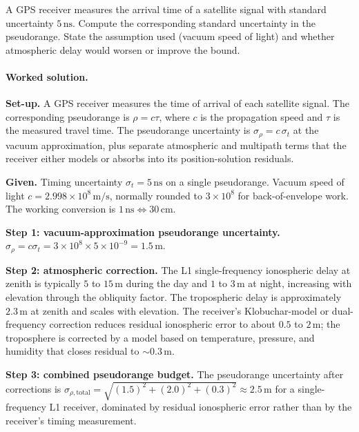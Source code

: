 \begin{exercise}
A GPS receiver measures the arrival time of a satellite signal with
standard uncertainty $5 \,\si{\nano\second}$. Compute the
corresponding standard uncertainty in the pseudorange. State the
assumption used (vacuum speed of light) and whether atmospheric
delay would worsen or improve the bound.

\paragraph{Worked solution.}
\textbf{Set-up.} A GPS receiver measures the time of arrival of
each satellite signal. The corresponding pseudorange is
$\rho = c \tau$, where $c$ is the propagation speed and $\tau$ is
the measured travel time. The pseudorange uncertainty is
$\sigma_{\rho} = c \,\sigma_{t}$ at the vacuum approximation,
plus separate atmospheric and multipath terms that the receiver
either models or absorbs into its position-solution residuals.

\textbf{Given.} Timing uncertainty $\sigma_{t} = 5 \,\si{\nano
\second}$ on a single pseudorange. Vacuum speed of light
$c = 2.998 \times 10^{8} \,\si{\meter\per\second}$, normally
rounded to $3 \times 10^{8}$ for back-of-envelope work. The
working conversion is $1 \,\si{\nano\second} \Leftrightarrow 30
\,\si{\centi\meter}$.

\textbf{Step 1: vacuum-approximation pseudorange uncertainty.}
$\sigma_{\rho} = c \sigma_{t} = 3 \times 10^{8} \times 5 \times
10^{-9} = 1.5 \,\si{\meter}$.

\textbf{Step 2: atmospheric correction.} The L1 single-frequency
ionospheric delay at zenith is typically $5$ to $15 \,\si{\meter}$
during the day and $1$ to $3 \,\si{\meter}$ at night, increasing
with elevation through the obliquity factor. The tropospheric
delay is approximately $2.3 \,\si{\meter}$ at zenith and scales
with elevation. The receiver's Klobuchar-model or dual-frequency
correction reduces residual ionospheric error to about $0.5$ to
$2 \,\si{\meter}$; the troposphere is corrected by a model based
on temperature, pressure, and humidity that closes residual to
$\sim 0.3 \,\si{\meter}$.

\textbf{Step 3: combined pseudorange budget.} The pseudorange
uncertainty after corrections is
$\sigma_{\rho,\text{total}} = \sqrt{(1.5)^{2} + (2.0)^{2} +
(0.3)^{2}} \approx 2.5 \,\si{\meter}$ for a single-frequency L1
receiver, dominated by residual ionospheric error rather than by
the receiver's timing measurement.


\end{exercise}
